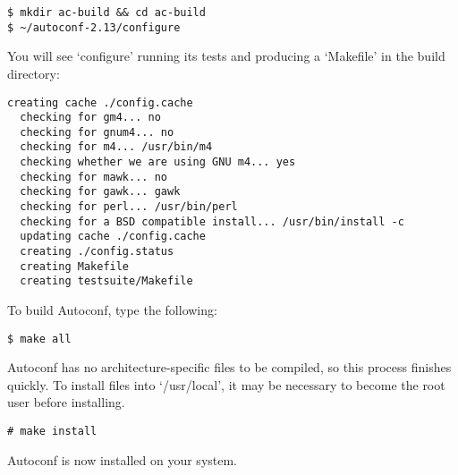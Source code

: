 \begin{verbatim}
$ mkdir ac-build && cd ac-build
$ ~/autoconf-2.13/configure 
\end{verbatim}

You will see `configure' running its tests and producing a `Makefile' in the build directory:

\begin{Verbatim}[frame=single]
  creating cache ./config.cache
  checking for gm4... no
  checking for gnum4... no
  checking for m4... /usr/bin/m4
  checking whether we are using GNU m4... yes
  checking for mawk... no
  checking for gawk... gawk
  checking for perl... /usr/bin/perl
  checking for a BSD compatible install... /usr/bin/install -c
  updating cache ./config.cache
  creating ./config.status
  creating Makefile
  creating testsuite/Makefile
\end{Verbatim}

To build Autoconf, type the following:

 	

\begin{verbatim}
$ make all
\end{verbatim}

Autoconf has no architecture-specific files to be compiled, so this process finishes quickly. To install files into `/usr/local', it may be necessary to become the root user before installing.

 	

\begin{verbatim}
# make install
\end{verbatim}

Autoconf is now installed on your system. 

